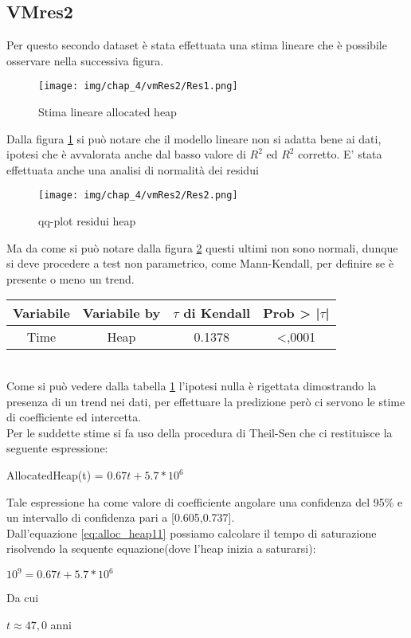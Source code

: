 \subsection{VMres2}

Per questo secondo dataset è stata effettuata una stima lineare che è possibile osservare nella successiva figura.
\begin{figure}[H]
    \centering
    \texttt{[image: img/chap\_4/vmRes2/Res1.png]}
    \caption{Stima lineare allocated heap}
    \label{fig:stim_lin_VmRes13}
\end{figure}
\noindent
Dalla figura \ref{fig:stim_lin_VmRes13} si può notare che il modello lineare non si adatta bene ai dati, ipotesi che è avvalorata anche dal basso valore di $R^2$ ed $R^2$ corretto.
E' stata effettuata anche una analisi di normalità dei residui
\begin{figure}[H]
    \centering
    \texttt{[image: img/chap\_4/vmRes2/Res2.png]}
    \caption{qq-plot residui heap}
    \label{fig:qq_plot_VmRes14}
\end{figure}
Ma da come si può notare dalla figura \ref{fig:qq_plot_VmRes14} questi ultimi non sono normali, dunque si deve procedere a test non parametrico, come Mann-Kendall, per definire se è presente o meno un trend.\\
\begin{table}[htbp]
    \centering
    \label{tab:Mann-kendall5}
    \begin{tabular}{|c|c|c|c|} %
        \hline
        Variabile & Variabile by & $\tau$ di Kendall &Prob > |$\tau$| \\ %
        \hline
        Time & Heap & 0.1378 & <,0001\\
        \hline
    \end{tabular}
\end{table}
\\
Come si può vedere dalla tabella \ref{tab:Mann-kendall5} l'ipotesi nulla è rigettata dimostrando la presenza di un trend nei dati, per effettuare la predizione però ci servono le stime di coefficiente ed intercetta.\\
Per le suddette stime si fa uso della procedura di Theil-Sen che ci restituisce la seguente espressione:
\begin{center}
   AllocatedHeap(t) = $0.67t + 5.7*10^6$
   \label{eq:alloc_heap11}
\end{center}
Tale espressione ha come valore di coefficiente angolare una confidenza del 95\% e un intervallo di confidenza pari a [0.605,0.737].\\
Dall'equazione \ref{eq:alloc_heap11} possiamo calcolare il tempo di saturazione risolvendo la sequente equazione(dove l'heap inizia a saturarsi):
\begin{center}
    $
    10^9 = 0.67t+5.7*10^6
    $\\
\end{center}
Da cui 
\begin{center}
    $
    t \approx 47,0$ anni
\end{center}

